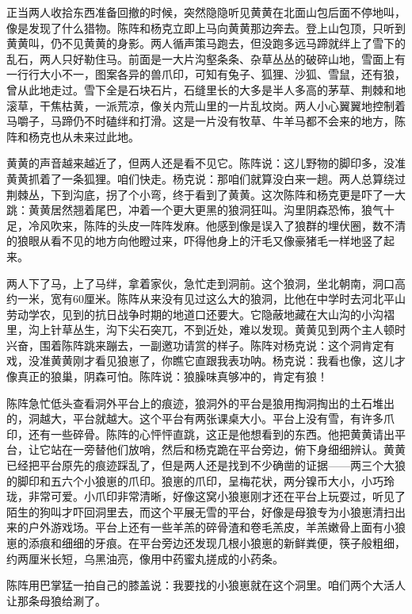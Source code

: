 \par 
\par 正当两人收拾东西准备回撤的时候，突然隐隐听见黄黄在北面山包后面不停地叫，像是发现了什么猎物。陈阵和杨克立即上马向黄黄那边奔去。登上山包顶，只听到黄黄叫，仍不见黄黄的身影。两人循声策马跑去，但没跑多远马蹄就绊上了雪下的乱石，两人只好勒住马。前面是一大片沟壑条条、杂草丛丛的破碎山地，雪面上有一行行大小不一，图案各异的兽爪印，可知有兔子、狐狸、沙狐、雪鼠，还有狼，曾从此地走过。雪下全是石块石片，石缝里长的大多是半人多高的茅草、荆棘和地滚草，干焦枯黄，一派荒凉，像关内荒山里的一片乱坟岗。两人小心翼翼地控制着马嚼子，马蹄仍不时磕绊和打滑。这是一片没有牧草、牛羊马都不会来的地方，陈阵和杨克也从未来过此地。
\par 黄黄的声音越来越近了，但两人还是看不见它。陈阵说：这儿野物的脚印多，没准黄黄抓着了一条狐狸。咱们快走。杨克说：那咱们就算没白来一趟。两人总算绕过荆棘丛，下到沟底，拐了个小弯，终于看到了黄黄。这次陈阵和杨克更是吓了一大跳：黄黄居然翘着尾巴，冲着一个更大更黑的狼洞狂叫。沟里阴森恐怖，狼气十足，冷风吹来，陈阵的头皮一阵阵发麻。他感到像是误入了狼群的埋伏圈，数不清的狼眼从看不见的地方向他瞪过来，吓得他身上的汗毛又像豪猪毛一样地竖了起来。
\par 两人下了马，上了马绊，拿着家伙，急忙走到洞前。这个狼洞，坐北朝南，洞口高约一米，宽有60厘米。陈阵从来没有见过这么大的狼洞，比他在中学时去河北平山劳动学农，见到的抗日战争时期的地道口还要大。它隐蔽地藏在大山沟的小沟褶里，沟上针草丛生，沟下尖石突兀，不到近处，难以发现。黄黄见到两个主人顿时兴奋，围着陈阵跳来蹦去，一副邀功请赏的样子。陈阵对杨克说：这个洞肯定有戏，没准黄黄刚才看见狼崽了，你瞧它直跟我表功呐。杨克说：我看也像，这儿才像真正的狼巢，阴森可怕。陈阵说：狼臊味真够冲的，肯定有狼！
\par 陈阵急忙低头查看洞外平台上的痕迹，狼洞外的平台是狼用掏洞掏出的土石堆出的，洞越大，平台就越大。这个平台有两张课桌大小。平台上没有雪，有许多爪印，还有一些碎骨。陈阵的心怦怦直跳，这正是他想看到的东西。他把黄黄请出平台，让它站在一旁替他们放哨，然后和杨克跪在平台旁边，俯下身细细辨认。黄黄已经把平台原先的痕迹踩乱了，但是两人还是找到不少确凿的证据——两三个大狼的脚印和五六个小狼崽的爪印。狼崽的爪印，呈梅花状，两分镍币大小，小巧玲珑，非常可爱。小爪印非常清晰，好像这窝小狼崽刚才还在平台上玩耍过，听见了陌生的狗叫才吓回洞里去，而这个平展无雪的平台，好像是母狼专为小狼崽清扫出来的户外游戏场。平台上还有一些羊羔的碎骨渣和卷毛羔皮，羊羔嫩骨上面有小狼崽的添痕和细细的牙痕。在平台旁边还发现几根小狼崽的新鲜粪便，筷子般粗细，约两厘米长短，乌黑油亮，像用中药蜜丸搓成的小药条。
\par 陈阵用巴掌猛一拍自己的膝盖说：我要找的小狼崽就在这个洞里。咱们两个大活人让那条母狼给涮了。
